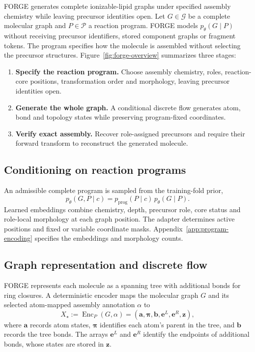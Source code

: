 \documentclass{article}
\theoremstyle{definition}
\begin{document}
FORGE generates complete ionizable-lipid graphs under specified assembly chemistry while
leaving precursor identities open. Let $G\in\mathcal G$ be a complete molecular graph and
$P\in\mathcal P$ a reaction program. FORGE models $p_\theta(G\mid P)$ without receiving
precursor identifiers, stored component graphs or fragment tokens. The program specifies how
the molecule is assembled without selecting the precursor structures. Figure~\ref{fig:forge-overview}
summarizes three stages:
\begin{enumerate}
    \item \textbf{Specify the reaction program.} Choose assembly chemistry, roles, reaction-core
    positions, transformation order and morphology, leaving precursor identities open.
    \item \textbf{Generate the whole graph.} A conditional discrete flow generates atom, bond and
    topology states while preserving program-fixed coordinates.
    \item \textbf{Verify exact assembly.} Recover role-assigned precursors and require their forward
    transform to reconstruct the generated molecule.
\end{enumerate}



\subsection{Conditioning on reaction programs}
\label{sec:program-conditioning}
An admissible complete program is sampled from the training-fold prior,
\begin{equation}
    p_\theta(G,P\mid c)=p_{\mathrm{prog}}(P\mid c)\,p_\theta(G\mid P).
\end{equation}
Learned embeddings combine chemistry, depth, precursor role, core status and role-local morphology
at each graph position. The adapter determines active positions and fixed or variable coordinate
masks. Appendix~\ref{app:program-encoding} specifies the embeddings and morphology counts.

\subsection{Graph representation and discrete flow}
\label{sec:graph-flow}

FORGE represents each molecule as a spanning tree with additional bonds for ring closures. A deterministic encoder maps the molecular graph $G$ and its selected atom-mapped
assembly annotation $\alpha$ to
\begin{equation}
      X_\star := \operatorname{Enc}_P(G,\alpha)
      = (\mathbf a,\boldsymbol\pi,\mathbf b,\mathbf e^L,\mathbf e^R,\mathbf z),
\end{equation}
where $\mathbf a$ records atom states, $\boldsymbol\pi$ identifies each atom's parent in the tree, and $\mathbf b$ records the tree bonds. The arrays $\mathbf e^L$ and $\mathbf e^R$ identify the endpoints of additional bonds, whose states are stored in $\mathbf z$.
\end{document}
